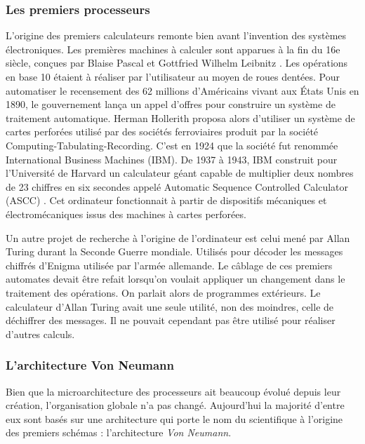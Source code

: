     
    \subsubsection{Les premiers processeurs}

        L'origine des premiers calculateurs remonte bien avant l'invention des systèmes électroniques. Les premières machines à calculer sont apparues à la fin du 16e siècle, conçues par Blaise Pascal et Gottfried Wilhelm Leibnitz \cite{Vie1996}. Les opérations en base 10 étaient à réaliser par l'utilisateur au moyen de roues dentées. 
        Pour automatiser le recensement des 62 millions d'Américains vivant aux États Unis en 1890, le gouvernement lança un appel d'offres pour construire un système de traitement automatique. Herman Hollerith proposa alors d'utiliser un système de cartes perforées utilisé par des sociétés ferroviaires produit par la société Computing-Tabulating-Recording.  C'est en 1924 que la société fut renommée  International Business Machines (IBM). De 1937 à 1943, IBM construit pour l'Université de Harvard un calculateur géant capable de multiplier deux nombres de 23 chiffres en six secondes appelé  Automatic Sequence Controlled Calculator (ASCC) \cite{cortada2016computer}. Cet ordinateur fonctionnait à partir de dispositifs mécaniques et électromécaniques issus des machines à cartes perforées.
        
        Un autre projet de recherche à l'origine de l'ordinateur est celui mené par Allan Turing durant la Seconde Guerre mondiale. Utilisés pour décoder les messages chiffrés d'Enigma utilisée par l'armée allemande. Le câblage de ces premiers automates devait être refait lorsqu'on voulait appliquer un changement dans le traitement des opérations. On parlait alors de programmes extérieurs. Le calculateur d'Allan Turing avait une seule utilité, non des moindres, celle de déchiffrer des messages. Il ne pouvait cependant pas être utilisé pour réaliser d'autres calculs.
        

    \subsubsection{L'architecture Von Neumann}\label{sec:vonneumann}
        
        Bien que la microarchitecture des processeurs ait beaucoup évolué depuis leur création, l'organisation globale n'a pas changé. Aujourd'hui la majorité d'entre eux sont basés sur une architecture qui porte le nom  du scientifique à l'origine des premiers schémas : l'architecture \textit{Von Neumann}.

